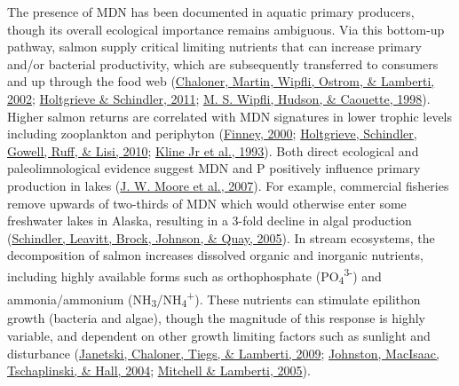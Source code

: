 \documentclass [11pt, proquest] {uwthesis}[2015/03/03]
\begin{document}
The presence of MDN has been documented in aquatic primary producers, though its overall ecological importance remains ambiguous. Via this bottom-up pathway, salmon supply critical limiting nutrients that can increase primary and/or bacterial productivity, which are subsequently transferred to consumers and up through the food web (\protect\hyperlink{ref-Chaloner2002}{Chaloner, Martin, Wipfli, Ostrom, \& Lamberti, 2002}; \protect\hyperlink{ref-Holtgrieve2011}{Holtgrieve \& Schindler, 2011}; \protect\hyperlink{ref-Wipfli1998}{M. S. Wipfli, Hudson, \& Caouette, 1998}). Higher salmon returns are correlated with MDN signatures in lower trophic levels including zooplankton and periphyton (\protect\hyperlink{ref-Finney2000}{Finney, 2000}; \protect\hyperlink{ref-Holtgrieve2010}{Holtgrieve, Schindler, Gowell, Ruff, \& Lisi, 2010}; \protect\hyperlink{ref-Kline1993}{Kline Jr et al., 1993}). Both direct ecological and paleolimnological evidence suggest MDN and P positively influence primary production in lakes (\protect\hyperlink{ref-Moore2007}{J. W. Moore et al., 2007}). For example, commercial fisheries remove upwards of two-thirds of MDN which would otherwise enter some freshwater lakes in Alaska, resulting in a 3-fold decline in algal production (\protect\hyperlink{ref-Schindler2005}{Schindler, Leavitt, Brock, Johnson, \& Quay, 2005}). In stream ecosystems, the decomposition of salmon increases dissolved organic and inorganic nutrients, including highly available forms such as orthophosphate (PO\textsubscript{4}\textsuperscript{3-}) and ammonia/ammonium (NH\textsubscript{3}/NH\textsubscript{4}\textsuperscript{+}). These nutrients can stimulate epilithon growth (bacteria and algae), though the magnitude of this response is highly variable, and dependent on other growth limiting factors such as sunlight and disturbance (\protect\hyperlink{ref-Janetski2009}{Janetski, Chaloner, Tiegs, \& Lamberti, 2009}; \protect\hyperlink{ref-Johnston2004}{Johnston, MacIsaac, Tschaplinski, \& Hall, 2004}; \protect\hyperlink{ref-Mitchell2005}{Mitchell \& Lamberti, 2005}).
\end{document}
